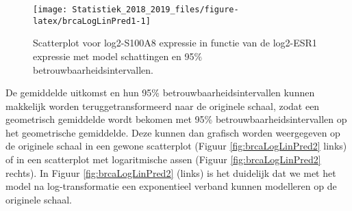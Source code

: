 \documentclass[12pt,dutch,coursenotes]{book}
\theoremstyle{definition}
\theoremstyle{definition}
\theoremstyle{definition}
\theoremstyle{remark}
\begin{document}
\begin{figure}

{\centering \texttt{[image: Statistiek\_2018\_2019\_files/figure-latex/brcaLogLinPred1-1]} 

}

\caption{Scatterplot voor log2-S100A8 expressie in functie van de log2-ESR1 expressie met model schattingen en 95$\%$ betrouwbaarheidsintervallen.}\label{fig:brcaLogLinPred1}
\end{figure}

De gemiddelde uitkomst en hun 95\% betrouwbaarheidsintervallen kunnen
makkelijk worden teruggetransformeerd naar de originele schaal, zodat
een geometrisch gemiddelde wordt bekomen met 95\%
betrouwbaarheidsintervallen op het geometrische gemiddelde. Deze kunnen
dan grafisch worden weergegeven op de originele schaal in een gewone
scatterplot (Figuur \ref{fig:brcaLogLinPred2} links) of in een
scatterplot met logaritmische assen (Figuur \ref{fig:brcaLogLinPred2}
rechts). In Figuur \ref{fig:brcaLogLinPred2} (links) is het duidelijk
dat we met het model na log-transformatie een exponentieel verband
kunnen modelleren op de originele schaal.
\end{document}
